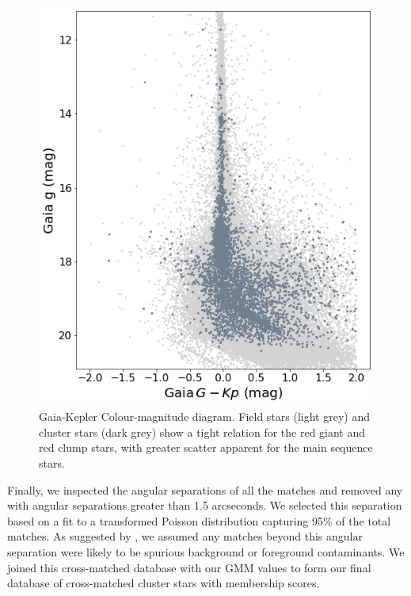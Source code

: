 \begin{figure}[htb]
    \centering
    \includegraphics[scale=0.5]{Chapter4/kic_gaia_photometric_comparison.png}
    \caption[Gaia-Kepler colour magnitude diagram]{Gaia-Kepler Colour-magnitude diagram. Field stars (light grey) and cluster stars (dark grey) show a tight relation for the red giant and red clump stars, with greater scatter apparent for the main sequence stars.}
    \label{fig:KGcmd}
\end{figure}

Finally, we inspected the angular separations of all the matches %
and removed any with angular separations greater than 1.5 arcseconds. We selected this separation based on a fit to a transformed Poisson distribution capturing 95\% of the total matches. As suggested by \citet{berger_revised_2018}, we assumed any matches beyond this angular separation were likely to be spurious background or foreground contaminants. We joined this cross-matched database with our GMM values to form our final database of cross-matched cluster stars with membership scores. 


